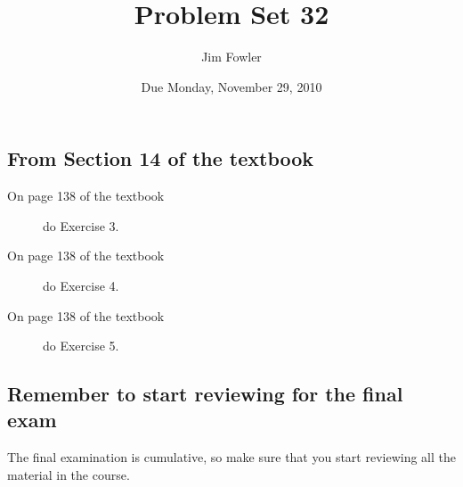 \documentclass[12pt]{handout}
\author{Jim Fowler}
\title{Problem Set 32}
\date{Due Monday, November 29, 2010}
\begin{document}
\maketitle










\subsection*{From Section 14 of the textbook}



\begin{description}

\item[On page 138 of the textbook] do Exercise 3.

\item[On page 138 of the textbook] do Exercise 4.

\item[On page 138 of the textbook] do Exercise 5.

\end{description}













\subsection*{Remember to start reviewing for the final exam}
The final examination is cumulative, so make sure that you start reviewing all the material in the course.
\end{document}
